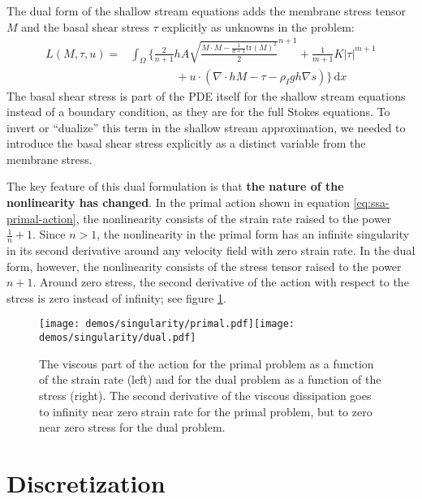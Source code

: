 \documentclass{article}
\theoremstyle{definition}
\theoremstyle{plain}
\newcommand{\ud}{\hspace{2pt}\mathrm{d}}
\begin{document}
The dual form of the shallow stream equations adds the membrane stress tensor $M$ and the basal shear stress $\tau$ explicitly as unknowns in the problem:
\begin{align}
    L(M, \tau, u) = & \int_\Omega\Bigg\{\frac{2}{n + 1}hA\sqrt{\frac{M\cdot M - \frac{1}{d + 1}\text{tr}(M)^2}{2}}^{n + 1} + \frac{1}{m + 1}K|\tau|^{m + 1} \nonumber\\
    & \qquad\qquad + u\cdot\left(\nabla\cdot hM - \tau - \rho_Igh\nabla s\right)\Bigg\}\ud x
\end{align}
The basal shear stress is part of the PDE itself for the shallow stream equations instead of a boundary condition, as they are for the full Stokes equations.
To invert or ``dualize'' this term in the shallow stream approximation, we needed to introduce the basal shear stress explicitly as a distinct variable from the membrane stress.

The key feature of this dual formulation is that \textbf{the nature of the nonlinearity has changed}.
In the primal action shown in equation \eqref{eq:ssa-primal-action}, the nonlinearity consists of the strain rate raised to the power $\frac{1}{n} + 1$.
Since $n > 1$, the nonlinearity in the primal form has an infinite singularity in its second derivative around any velocity field with zero strain rate.
In the dual form, however, the nonlinearity consists of the stress tensor raised to the power $n + 1$.
Around zero stress, the second derivative of the action with respect to the stress is zero instead of infinity; see figure \ref{fig:primal-vs-dual}.

\begin{figure}[t]
    \texttt{[image: demos/singularity/primal.pdf]}\texttt{[image: demos/singularity/dual.pdf]}
    \caption{The viscous part of the action for the primal problem as a function of the strain rate (left) and for the dual problem as a function of the stress (right).
    The second derivative of the viscous dissipation goes to infinity near zero strain rate for the primal problem, but to zero near zero stress for the dual problem.}
    \label{fig:primal-vs-dual}
\end{figure}


\section{Discretization}
\end{document}
